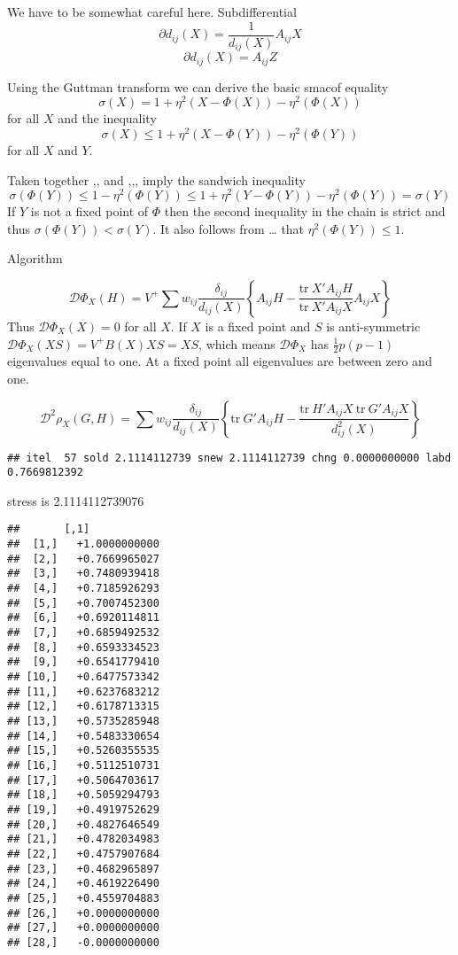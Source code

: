 \documentclass[
  12pt,
]{article}
\begin{document}
We have to be somewhat careful here. Subdifferential
\[
\partial d_{ij}(X)=\frac{1}{d_{ij}(X)}A_{ij}X
\]
\[
\partial d_{ij}(X)=A_{ij}Z
\]

Using the Guttman transform we can derive the basic smacof equality
\[
\sigma(X)=1+\eta^2(X-\Phi(X))-\eta^2(\Phi(X))
\]
for all \(X\) and the inequality
\[
\sigma(X)\leq 1+\eta^2(X-\Phi(Y))-\eta^2(\Phi(Y))
\]
for all \(X\) and \(Y\).

Taken together ,, and ,,, imply the sandwich inequality
\[
\sigma(\Phi(Y))\leq 1-\eta^2(\Phi(Y))\leq 1+\eta^2(Y-\Phi(Y))-\eta^2(\Phi(Y))=\sigma(Y)
\]
If \(Y\) is not a fixed point of \(\Phi\) then the second inequality in the
chain is strict and thus \(\sigma(\Phi(Y))<\sigma(Y)\). It also follows
from \ldots{} that \(\eta^2(\Phi(Y))\leq 1\).

Algorithm

\[
\mathcal{D}\Phi_X(H)=V^+\sum w_{ij}\frac{\delta_{ij}}{d_{ij}(X)}\left\{A_{ij}H-\frac{\text{tr}\ X'A_{ij}H}{ \text{tr}\ X'A_{ij}X}A_{ij}X\right\}
\]
Thus \(\mathcal{D}\Phi_X(X)=0\) for all \(X\). If \(X\) is a fixed point and \(S\) is anti-symmetric \(\mathcal{D}\Phi_X(XS)=V^+B(X)XS=XS\),
which means \(\mathcal{D}\Phi_X\) has \(\frac12p(p-1)\) eigenvalues equal to one.
At a fixed point all eigenvalues are between zero and one.

\[
\mathcal{D}^2\rho_X(G,H)=\sum w_{ij}\frac{\delta_{ij}}{d_{ij}(X)}\left\{\text{tr}\ G'A_{ij}H-\frac{\text{tr}\ H'A_{ij}X\ \text{tr}\ G'A_{ij}X}{ d_{ij}^2(X)}\right\}
\]

\begin{verbatim}
## itel  57 sold 2.1114112739 snew 2.1114112739 chng 0.0000000000 labd 0.7669812392
\end{verbatim}

stress is 2.1114112739076

\begin{verbatim}
##       [,1]           
##  [1,]   +1.0000000000
##  [2,]   +0.7669965027
##  [3,]   +0.7480939418
##  [4,]   +0.7185926293
##  [5,]   +0.7007452300
##  [6,]   +0.6920114811
##  [7,]   +0.6859492532
##  [8,]   +0.6593334523
##  [9,]   +0.6541779410
## [10,]   +0.6477573342
## [11,]   +0.6237683212
## [12,]   +0.6178713315
## [13,]   +0.5735285948
## [14,]   +0.5483330654
## [15,]   +0.5260355535
## [16,]   +0.5112510731
## [17,]   +0.5064703617
## [18,]   +0.5059294793
## [19,]   +0.4919752629
## [20,]   +0.4827646549
## [21,]   +0.4782034983
## [22,]   +0.4757907684
## [23,]   +0.4682965897
## [24,]   +0.4619226490
## [25,]   +0.4559704883
## [26,]   +0.0000000000
## [27,]   +0.0000000000
## [28,]   -0.0000000000
\end{verbatim}
\end{document}
